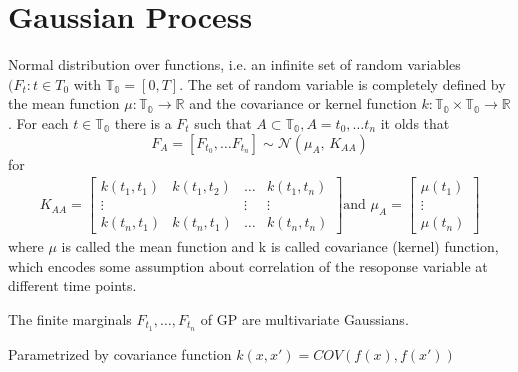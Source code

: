 \usepackage{amsfonts}
\usepackage{amsmath}\chapter{Gaussian Process}

Normal distribution over functions, i.e. an infinite set of random
variables $(F_t: t \in T_0$ with $\mathbb{T_0}=[0, T]$.
The set of random variable is completely defined by the
mean function $\mu: \mathbb{T_0} \to \mathbb{R}$ and the covariance or kernel
function $k: \mathbb{T_0} \times \mathbb{T_0} \to \mathbb{R}$.
For each $t \in \mathbb{T_0}$ there is a $F_t$ such that
$A \subset \mathbb{T_0}, A={t_0, \dots t_n}$
it olds that
\[F_A = [F_{t_0}, \dots F_{t_n}] \sim \mathcal{N}(\mu_A,\,K_{AA})\]
for
\begin{gather*}
    K_{AA} =
    \begin{bmatrix}
        k(t_1, t_1) & k(t_1, t_2) & \dots & k(t_1, t_n)\\
        \vdots  &  & \vdots  & \vdots \\
        k(t_n, t_1)  & k(t_n, t_1) & \dots  & k(t_n, t_n)
    \end{bmatrix} \text{and }
    \mu_A =
    \begin{bmatrix}
        \mu(t_1) \\
        \vdots \\
        \mu(t_n)
    \end{bmatrix}
\end{gather*}
where $\mu$ is called the mean function and k is called covariance (kernel) function, which encodes some assumption
about correlation of the resoponse variable at different time points.

The finite marginals $F_{t_1}, \dots, F_{t_n}$ of GP are multivariate Gaussians.

Parametrized by covariance function $k(x,x') = COV(f(x), f(x'))$



